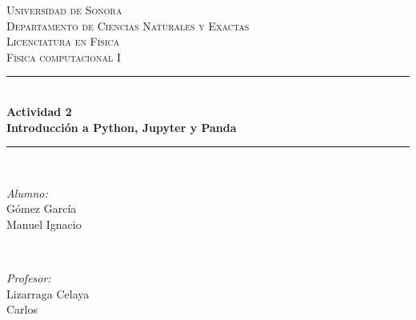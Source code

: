 \begin{titlepage}

\newcommand{\HRule}{\rule{\linewidth}{0.5mm}} %

\center %
 

\textsc{\LARGE Universidad de Sonora }\\[0.3cm] %
\textsc{\Large Departamento de Ciencias Naturales y Exactas  }\\[0.3cm]
\textsc{\Large Licenciatura en Física }\\[0.3cm]
\textsc{\Large Física computacional I}\\[0.3cm] %


\HRule \\[0.1cm]
{ \huge \bfseries Actividad 2\\  Introducción a Python, Jupyter y Panda}\\[0.01cm] %
\HRule \\[1.5cm]

 

\begin{minipage}{0.4\textwidth}
\begin{flushleft} \large
\emph{Alumno:}\\
Gómez García \\Manuel Ignacio\\ %
\end{flushleft}
\end{minipage}
~
\begin{minipage}{0.4\textwidth}
\begin{flushright} \large
\emph{Profesor:} \\
Lizarraga Celaya\\Carlos\\%
\end{flushright}
\end{minipage}\\[1cm]


\end{titlepage}
